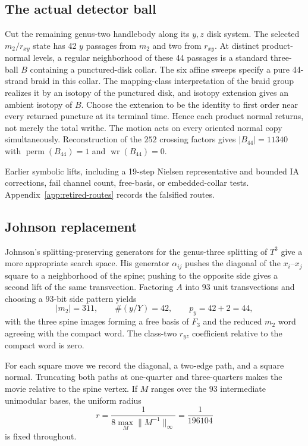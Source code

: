 \subsection{The actual detector ball}

Cut the remaining genus-two handlebody along its $y,z$ disk system.  The
selected $m_2/r_{xy}$ state has 42 $y$ passages from $m_2$ and two from
$r_{xy}$.  At distinct product-normal levels, a regular neighborhood of these
44 passages is a standard three-ball $B$ containing a punctured-disk collar.
The six affine sweeps specify a pure 44-strand braid in this collar.  The
mapping-class interpretation of the braid group realizes it by an isotopy of
the punctured disk, and isotopy extension gives an ambient isotopy of $B$.
Choose the extension to be the identity to first order near every returned
puncture at its terminal time.  Hence each product normal returns, not merely
the total writhe.  The motion acts on every oriented normal copy
simultaneously.  Reconstruction of the $252$ crossing factors gives
$|B_{44}|=11340$ with $\operatorname{perm}(B_{44})=1$ and
$\operatorname{wr}(B_{44})=0$.

\begin{remark}
Earlier symbolic lifts, including a 19-step Nielsen representative and
bounded IA corrections, fail channel count, free-basis, or embedded-collar
tests.  Appendix~\ref{app:retired-routes} records the falsified routes.
\end{remark}

\subsection{Johnson replacement}

Johnson's splitting-preserving generators for the genus-three splitting of
$T^3$ \cite{Johnson2011} give a more appropriate search space.  His generator
$\alpha_{ij}$ pushes the diagonal of the $x_i$--$x_j$ square to a
neighborhood of the spine; pushing to the opposite side gives a second lift of
the same transvection.  Factoring $A$ into $93$ unit transvections and choosing
a $93$-bit side pattern yields
\[
|m_2|=311,\qquad \#(y/Y)=42,\qquad p_y=42+2=44,
\]
with the three spine images forming a free basis of $F_3$ and the reduced
$m_2$ word agreeing with the compact word.  The class-two $r_{yz}$ coefficient
relative to the compact word is zero.

For each square move we record the diagonal, a two-edge path, and a square
normal.  Truncating both paths at one-quarter and three-quarters makes the
movie relative to the spine vertex.  If $M$ ranges over the $93$ intermediate
unimodular bases, the uniform radius
\[
r=\frac{1}{8\max_M\lVert M^{-1}\rVert_\infty}=\frac1{196104}
\]
is fixed throughout.

